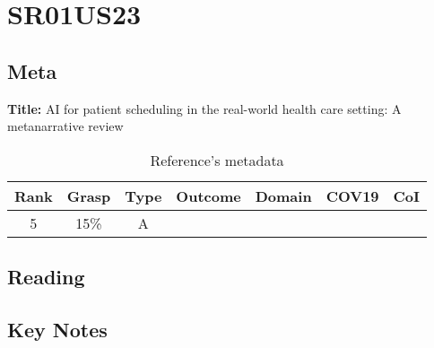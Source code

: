 \section{ SR01US23 }


\subsection{Meta}
    \textbf{Title:}
    AI for patient scheduling in the real-world health care setting: A metanarrative review

    \begin{table}[H]
        \centering
        \begin{tabular}{|c|c|c|c|c|c|c|}
            \hline
                \textbf{Rank} & \textbf{Grasp} & \textbf{Type} & \textbf{Outcome} & \textbf{Domain} & \textbf{COV19} & \textbf{CoI} \\
            \hline
                5 & 15\% & A &  &  &  &  \\
            \hline
        \end{tabular}
        \caption{Reference's metadata}
        \label{tab:simple}
    \end{table}

\subsection{Reading}


\subsection{Key Notes}
